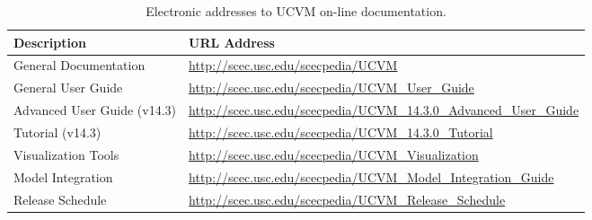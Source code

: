 
\begin{table*}[t]
\centering
\small
\caption{Electronic addresses to UCVM on-line documentation.}
\begin{tabular}[]{ll}
\\
Description                 & URL Address                                                         \\
\hline
General Documentation       & \url{http://scec.usc.edu/scecpedia/UCVM}                            \\
General User Guide          & \url{http://scec.usc.edu/scecpedia/UCVM_User_Guide}                 \\
Advanced User Guide (v14.3) & \url{http://scec.usc.edu/scecpedia/UCVM_14.3.0_Advanced_User_Guide} \\
Tutorial (v14.3)            & \url{http://scec.usc.edu/scecpedia/UCVM_14.3.0_Tutorial}            \\
Visualization Tools         & \url{http://scec.usc.edu/scecpedia/UCVM_Visualization}              \\
Model Integration           & \url{http://scec.usc.edu/scecpedia/UCVM_Model_Integration_Guide}    \\
Release Schedule            & \url{http://scec.usc.edu/scecpedia/UCVM_Release_Schedule}           \\
\hline
\end{tabular}
\label{tab:manuals}
\end{table*}
